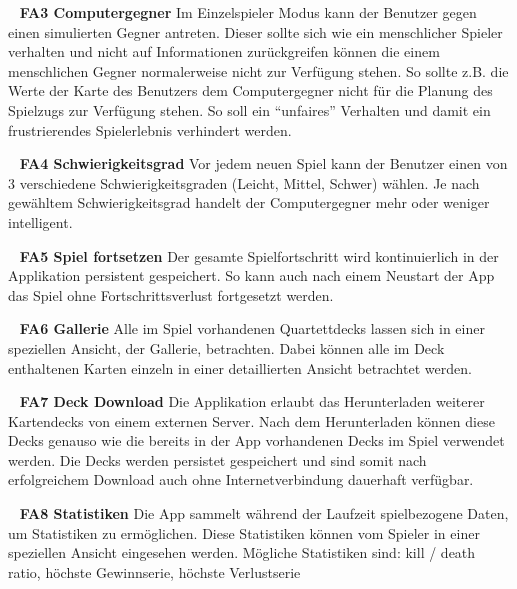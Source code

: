 \documentclass{scrartcl}
\begin{document}
\ \newline
\textbf{FA3 Computergegner} \newline
Im Einzelspieler Modus kann der Benutzer gegen einen simulierten Gegner antreten.
Dieser sollte sich wie ein menschlicher Spieler verhalten und nicht auf
Informationen zurückgreifen können die einem menschlichen Gegner normalerweise
nicht zur Verfügung stehen. So sollte z.B. die Werte der Karte des Benutzers dem
Computergegner nicht für die Planung des Spielzugs zur Verfügung stehen. So soll
ein \enquote{unfaires} Verhalten und damit ein frustrierendes Spielerlebnis
verhindert werden.

\ \newline
\textbf{FA4 Schwierigkeitsgrad} \newline
Vor jedem neuen Spiel kann der Benutzer einen von 3 verschiedene
Schwierigkeitsgraden (Leicht, Mittel, Schwer) wählen. Je nach gewähltem
Schwierigkeitsgrad handelt der Computergegner mehr oder weniger intelligent.

\ \newline
\textbf{FA5 Spiel fortsetzen} \newline
Der gesamte Spielfortschritt wird kontinuierlich in der Applikation persistent
gespeichert. So kann auch nach einem Neustart der App das Spiel ohne
Fortschrittsverlust fortgesetzt werden.

\ \newline
\textbf{FA6 Gallerie} \newline
Alle im Spiel vorhandenen Quartettdecks lassen sich in einer speziellen Ansicht,
der Gallerie, betrachten. Dabei können alle im Deck enthaltenen Karten einzeln
in einer detaillierten Ansicht betrachtet werden.

\ \newline
\textbf{FA7 Deck Download} \newline
Die Applikation erlaubt das Herunterladen weiterer Kartendecks von einem
externen Server. Nach dem Herunterladen können diese Decks genauso wie die
bereits in der App vorhandenen Decks im Spiel verwendet werden. Die Decks werden
persistet gespeichert und sind somit nach erfolgreichem Download auch ohne
Internetverbindung dauerhaft verfügbar.

\ \newline
\textbf{FA8 Statistiken} \newline
Die App sammelt während der Laufzeit spielbezogene Daten, um Statistiken zu
ermöglichen. Diese Statistiken können vom Spieler in einer speziellen Ansicht
eingesehen werden. Mögliche Statistiken sind: kill / death ratio, höchste
Gewinnserie, höchste Verlustserie
\end{document}
